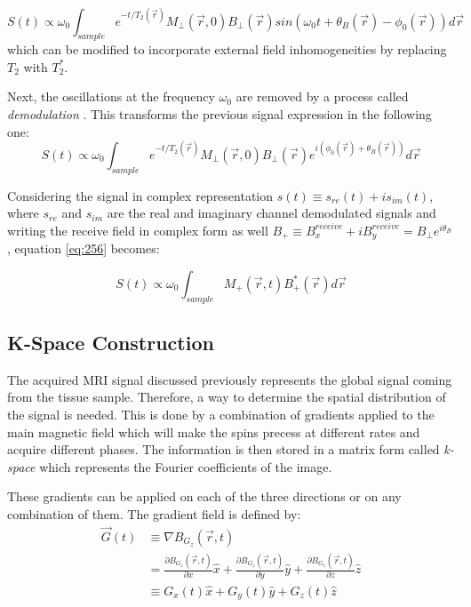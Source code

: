 \begin{equation}
    S(t) \propto
        \omega_0 \int_{sample} e^{-t/T_2(\vec{r})} M_{\perp}(\vec{r},0) 
            B_{\perp}(\vec{r}) sin(\omega_0 t + \theta_B(\vec{r}) - \phi_0(\vec{r})) d\vec{r}
\end{equation}
which can be modified to incorporate external field inhomogeneities by replacing $T_2$ with $T_2^*$.

Next, the oscillations at the frequency $\omega_0$ are removed by a process called \textit{demodulation} \cite{Haacke1999}. This transforms the previous signal expression in the following one:
\begin{equation} \label{eq:256}
    S(t) \propto
        \omega_0 \int_{sample} e^{-t/T_2(\vec{r})} M_{\perp}(\vec{r},0) 
            B_{\perp}(\vec{r}) e^{i(\phi_0(\vec{r}) + \theta_B(\vec{r}))} d\vec{r}
\end{equation}

Considering the signal in complex representation $s(t) \equiv s_{re}(t) + i s_{im}(t)$, where $s_{re}$ and $s_{im}$ are the real and imaginary channel demodulated signals and writing the receive field in complex form as well $B_{+} \equiv B_x^{receive} + i B_y^{receive} = B_{\perp} e^{i \theta_B}$, equation \ref{eq:256} becomes:

\begin{equation} \label{eq:257}
    S(t) \propto
        \omega_0 \int_{sample} M_{+}(\vec{r}, t) B_{+}^* (\vec{r}) d\vec{r}
\end{equation}



\subsection{K-Space Construction}
The acquired MRI signal discussed previously represents the global signal coming from the tissue sample. Therefore, a way to determine the spatial distribution of the signal is needed. This is done by a combination of gradients applied to the main magnetic field which will make the spins precess at different rates and acquire different phases. The information is then stored in a matrix form called \textit{k-space} which represents the Fourier coefficients of the image.

These gradients can be applied on each of the three directions or on any combination of them. The gradient field is defined by:
\begin{equation}
    \begin{split}
        \vec{G}(t) & \equiv \nabla B_{G_z}(\vec{r}, t) \\
                   &    =   \frac{\partial B_{G_z}(\vec{r},t)}{\partial x} \hat{x} + \frac{\partial B_{G_z}(\vec{r},t)}{\partial y} \hat{y} + \frac{\partial B_{G_z}(\vec{r},t)}{\partial z} \hat{z} \\
                   & \equiv G_x(t) \hat{x} + G_y(t) \hat{y} + G_z(t) \hat{z}
    \end{split}
\end{equation}

